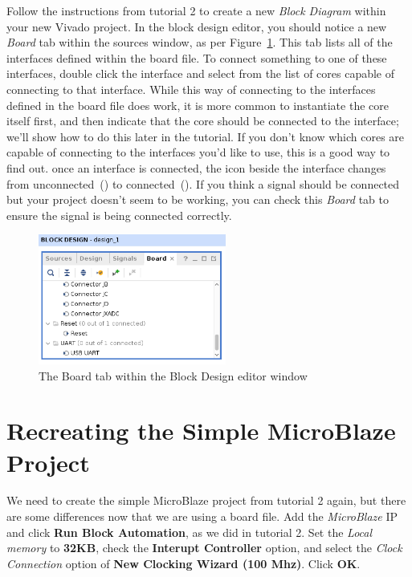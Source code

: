 \documentclass[11pt]{article}
\begin{document}
Follow the instructions from tutorial 2 to create a new \textit{Block Diagram} within your new Vivado project. In the block design editor, you should notice a new \textit{Board} tab within the sources window, as per Figure~\ref{fig:board_sources_tab}. This tab lists all of the interfaces defined within the board file. To connect something to one of these interfaces, double click the interface and select from the list of cores capable of connecting to that interface. While this way of connecting to the interfaces defined in the board file does work, it is more common to instantiate the core itself first, and then indicate that the core should be connected to the interface; we'll show how to do this later in the tutorial. If you don't know which cores are capable of connecting to the interfaces you'd like to use, this is a good way to find out. once an interface is connected, the icon beside the interface changes from unconnected~()
to connected~(). If you think a signal should be connected but your project doesn't seem to be working, you can check this \textit{Board} tab to ensure the signal is being connected correctly.

\begin{figure}[!h]
    \centering
    \includegraphics[width=0.55\textwidth]{images/board_sources_tab.png}
    \caption{The Board tab within the Block Design editor window}
    \label{fig:board_sources_tab}
\end{figure}




\section{Recreating the Simple MicroBlaze Project}
\label{sec:adding_cores}
We need to create the simple MicroBlaze project from tutorial 2 again, but there are some differences now that we are using a board file. Add the \textit{MicroBlaze} IP and click \textbf{Run Block Automation}, as we did in tutorial 2. Set the \textit{Local memory} to \textbf{32KB}, check the \textbf{Interupt Controller} option, and select the \textit{Clock Connection} option of \textbf{New Clocking Wizard (100 Mhz)}. Click \textbf{OK}. 
\end{document}
